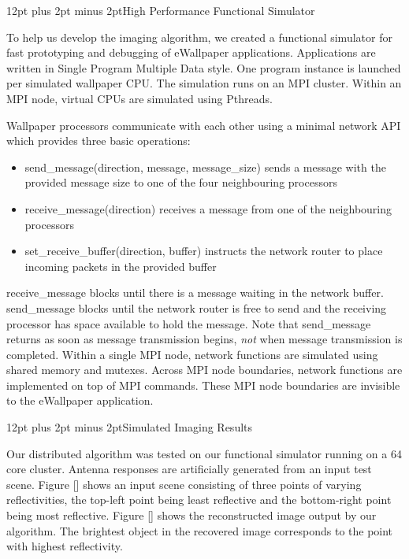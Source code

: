 \documentclass[twocolumn]{article}
\makeatletter
\def\section{\@startsection{section}{1}{\z@}{24pt plus 2 pt
minus 2 pt} {12pt plus 2pt minus 2pt}{\large\bf}}
\makeatother
\begin{document}
\section{High Performance Functional Simulator}

To help us develop the imaging algorithm, we created a functional simulator for fast prototyping and debugging of eWallpaper applications. Applications are written in Single Program Multiple Data style. One program instance is launched per simulated wallpaper CPU. The simulation runs on an MPI cluster. Within an MPI node, virtual CPUs are simulated using Pthreads.

Wallpaper processors communicate with each other using a minimal network API which provides three basic operations:
\begin{itemize}
\item send\_message(direction, message, message\_size) sends a message with the provided message size to one of the four neighbouring processors
\item receive\_message(direction) receives a message from one of the neighbouring processors
\item set\_receive\_buffer(direction, buffer) instructs the network router to place incoming packets in the provided buffer
\end{itemize}

receive\_message blocks until there is a message waiting in the network buffer. send\_message blocks until the network router is free to send and the receiving processor has space available to hold the message. Note that send\_message returns as soon as message transmission begins, \emph{not} when message transmission is completed. Within a single MPI node, network functions are simulated using shared memory and mutexes. Across MPI node boundaries, network functions are implemented on top of MPI commands. These MPI node boundaries are invisible to the eWallpaper application.

\section{Simulated Imaging Results}

Our distributed algorithm was tested on our functional simulator running on a 64 core cluster. Antenna responses are artificially generated from an input test scene. Figure [] shows an input scene consisting of three points of varying reflectivities, the top-left point being least reflective and the bottom-right point being most reflective. Figure [] shows the reconstructed image output by our algorithm. The brightest object in the recovered image corresponds to the point with highest reflectivity. 
\end{document}
